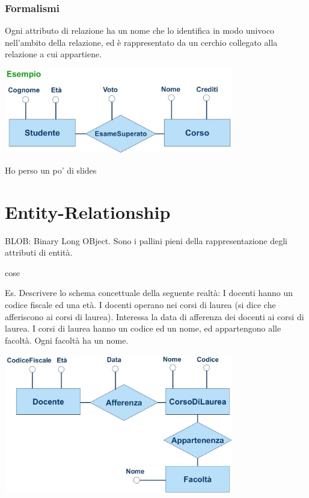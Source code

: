 \subsubsection{Formalismi}
Ogni attributo di relazione ha un nome che lo identifica in
modo univoco nell’ambito della relazione, ed è
rappresentato da un cerchio collegato alla relazione a cui
appartiene.
\begin{center}
    \includegraphics[width=0.75\textwidth]{chaptersLezioniSara/img/Attributi_relazione1.jpg}
\end{center}

Ho perso un po' di slides

\section{Entity-Relationship}


BLOB: Binary Long OBject. Sono i pallini pieni della rappresentazione degli attributi di entità.

cose

Es.
Descrivere lo schema concettuale della seguente realtà:
I docenti hanno un codice fiscale ed una età. I docenti operano nei corsi di laurea
(si dice che afferiscono ai corsi di laurea). Interessa la data di afferenza dei docenti
ai corsi di laurea. I corsi di laurea hanno un codice ed un nome, ed appartengono
alle facoltà. Ogni facoltà ha un nome.
\begin{center}
    \includegraphics[width=0.75\textwidth]{chaptersLezioniSara/img/ER_es1_sol.jpg}
\end{center}

